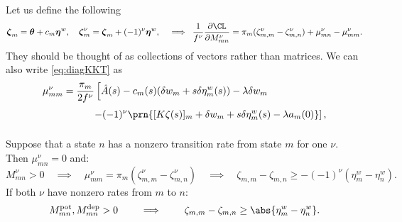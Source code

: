 \documentclass[12pt]{article}
\newcommand{\eqm}{\pi}
\newcommand{\etwm}{\eta^w}
\newcommand{\etw}{\boldsymbol{\eta}^w}
\newcommand{\thbm}{\theta}
\newcommand{\thb}{\boldsymbol{\thbm}}
\newcommand{\dgnm}{\zeta}
\newcommand{\dgn}{\boldsymbol{\dgnm}}
\newcommand{\wm}{w}
\newcommand{\MMdm}{M}
\newcommand{\encm}{K}
\newcommand{\pot}{^{\text{pot}}}
\newcommand{\dep}{^{\text{dep}}}
\renewcommand{\pdiff}[2]{\frac{\partial #1}{\partial #2}}
\begin{document}
Let us define the following
%
\begin{equation}\label{eq:degenerate}
  \dgn_{m} = \thb + c_m \etw,
  \quad
  \dgn^\nu_m = \dgn_m + (-1)^\nu \etw,
  \quad \implies \;
  \frac{1}{f^\nu} \pdiff{\CL}{\MMdm^\nu_{mn}} = \eqm_m (\dgnm^\nu_{m,m} - \dgnm^\nu_{m,n}) + \mu^\nu_{mn} - \mu^\nu_{mm}.
\end{equation}
%
They should be thought of as collections of vectors rather than matrices.
We can also write \cref{eq:diagKKT} as
%
\begin{equation}\label{eq:diagKKTz}
\begin{aligned}
  \mu^\nu_{mm} &= \frac{\eqm_m}{2f^\nu} 
    \left[ 
      \hat{A}(s) - c_m(s) (\delta \wm_m + s \delta \etwm_m(s))
      - \lambda \delta w_m
    \right. \\ &\phantom{= \frac{\eqm_m}{2f^\nu} }
    \left.
      - (-1)^\nu \prn{ 
        [\encm \dgnm(s)]_m
        + \delta \wm_m + s \delta \etwm_m(s)
        - \lambda a_m(0)
      }
    \right], \\
\end{aligned}
\end{equation}
%

Suppose that a state \(n\) has a nonzero transition rate from state \(m\) for one \(\nu\).
Then \(\mu^\nu_{mn} = 0\) and:
%
\begin{equation}\label{eq:oneexit}
  \MMdm^\nu_{mn} > 0
  \quad \implies \quad
  \mu^\nu_{mm} = \eqm_m (\dgnm^\nu_{m,m} - \dgnm^\nu_{m,n})
  \quad \implies \quad
  \dgnm_{m,m} - \dgnm_{m,n} \geq - (-1)^\nu (\etwm_m - \etwm_n).
\end{equation}
%
If both \(\nu\) have nonzero rates from \(m\) to \(n\):
%
\begin{equation}\label{eq:doubleexit}
  \MMdm\pot_{mn}, \MMdm\dep_{mn} > 0
  \qquad \implies \qquad
  \dgnm_{m,m} - \dgnm_{m,n} \geq\abs{\etwm_m - \etwm_n}.
\end{equation}
%
\end{document}
